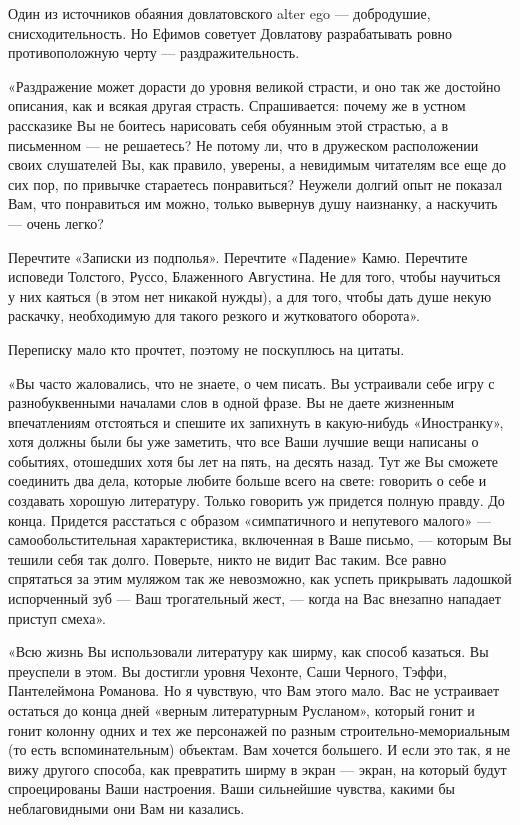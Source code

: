 Один из источников обаяния довлатовского alter ego — добродушие,
снисходительность. Но Ефимов советует Довлатову разрабатывать ровно
противоположную черту — раздражительность.

«Раздражение может дорасти до уровня великой страсти, и оно так же достойно
описания, как и всякая другая страсть. Спрашивается: почему же в устном
рассказике Вы не боитесь нарисовать себя обуянным этой страстью, а в письменном
— не решаетесь? Не потому ли, что в дружеском расположении своих слушателей Bы,
как правило, уверены, а невидимым читателям все еще до сих пор, по привычке
стараетесь понравиться? Неужели долгий опыт не показал Вам, что понравиться им
можно, только вывернув душу наизнанку, а наскучить — очень легко? 

Перечтите «Записки из подполья». Перечтите «Падение» Камю. Перечтите исповеди
Толстого, Руссо, Блаженного Августина. Не для того, чтобы научиться у них
каяться (в этом нет никакой нужды), а для того, чтобы дать душе некую раскачку,
необходимую для такого резкого и жутковатого оборота».

Переписку мало кто прочтет, поэтому не поскуплюсь на цитаты. 

«Вы часто жаловались, что не знаете, о чем писать. Вы устраивали себе игру с
разнобуквенными началами слов в одной фразе. Вы не даете жизненным впечатлениям
отстояться и спешите их запихнуть в какую-нибудь «Иностранку», хотя должны были
бы уже заметить, что все Ваши лучшие вещи написаны о событиях, отошедших хотя
бы лет на пять, на десять назад. Тут же Вы сможете соединить два дела, которые
любите больше всего на свете: говорить о себе и создавать хорошую литературу.
Только говорить уж придется полную правду. До конца. Придется расстаться с
образом «симпатичного и непутевого малого» — самообольстительная
характеристика, включенная в Ваше письмо, — которым Вы тешили себя так долго.
Поверьте, никто не видит Вас таким. Все равно спрятаться за этим муляжом так же
невозможно, как успеть прикрывать ладошкой испорченный зуб — Ваш трогательный
жест, — когда на Вас внезапно нападает приступ смеха». 

«Всю жизнь Вы использовали литературу как ширму, как способ казаться. Вы
преуспели в этом. Вы достигли уровня Чехонте, Саши Черного, Тэффи, Пантелеймона
Романова. Но я чувствую, что Вам этого мало. Вас не устраивает остаться до
конца дней «верным литературным Русланом», который гонит и гонит колонну одних
и тех же персонажей по разным строительно-мемориальным (то есть
вспоминательным) объектам. Вам хочется большего. И если это так, я не вижу
другого способа, как превратить ширму в экран — экран, на который будут
спроецированы Ваши настроения. Ваши сильнейшие чувства, какими бы
неблаговидными они Вам ни казались. 

